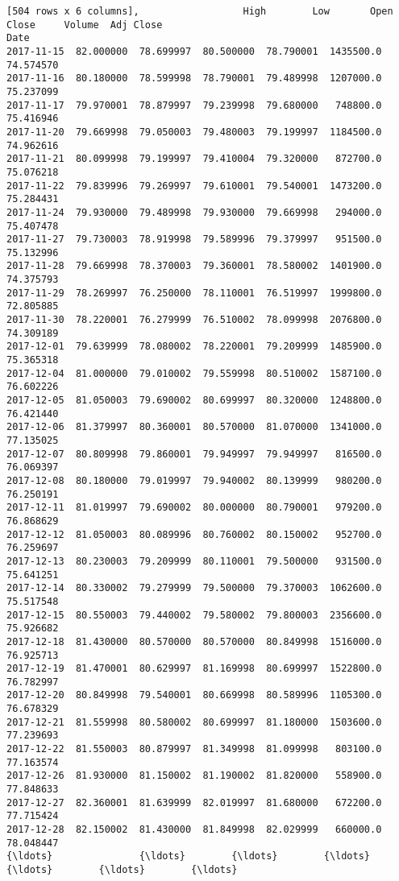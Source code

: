 \documentclass[11pt]{article}
\begin{document}
\begin{Verbatim}[commandchars=\\\{\}]
[504 rows x 6 columns],                  High        Low       Open      Close     Volume  Adj Close
Date                                                                        
2017-11-15  82.000000  78.699997  80.500000  78.790001  1435500.0  74.574570
2017-11-16  80.180000  78.599998  78.790001  79.489998  1207000.0  75.237099
2017-11-17  79.970001  78.879997  79.239998  79.680000   748800.0  75.416946
2017-11-20  79.669998  79.050003  79.480003  79.199997  1184500.0  74.962616
2017-11-21  80.099998  79.199997  79.410004  79.320000   872700.0  75.076218
2017-11-22  79.839996  79.269997  79.610001  79.540001  1473200.0  75.284431
2017-11-24  79.930000  79.489998  79.930000  79.669998   294000.0  75.407478
2017-11-27  79.730003  78.919998  79.589996  79.379997   951500.0  75.132996
2017-11-28  79.669998  78.370003  79.360001  78.580002  1401900.0  74.375793
2017-11-29  78.269997  76.250000  78.110001  76.519997  1999800.0  72.805885
2017-11-30  78.220001  76.279999  76.510002  78.099998  2076800.0  74.309189
2017-12-01  79.639999  78.080002  78.220001  79.209999  1485900.0  75.365318
2017-12-04  81.000000  79.010002  79.559998  80.510002  1587100.0  76.602226
2017-12-05  81.050003  79.690002  80.699997  80.320000  1248800.0  76.421440
2017-12-06  81.379997  80.360001  80.570000  81.070000  1341000.0  77.135025
2017-12-07  80.809998  79.860001  79.949997  79.949997   816500.0  76.069397
2017-12-08  80.180000  79.019997  79.940002  80.139999   980200.0  76.250191
2017-12-11  81.019997  79.690002  80.000000  80.790001   979200.0  76.868629
2017-12-12  81.050003  80.089996  80.760002  80.150002   952700.0  76.259697
2017-12-13  80.230003  79.209999  80.110001  79.500000   931500.0  75.641251
2017-12-14  80.330002  79.279999  79.500000  79.370003  1062600.0  75.517548
2017-12-15  80.550003  79.440002  79.580002  79.800003  2356600.0  75.926682
2017-12-18  81.430000  80.570000  80.570000  80.849998  1516000.0  76.925713
2017-12-19  81.470001  80.629997  81.169998  80.699997  1522800.0  76.782997
2017-12-20  80.849998  79.540001  80.669998  80.589996  1105300.0  76.678329
2017-12-21  81.559998  80.580002  80.699997  81.180000  1503600.0  77.239693
2017-12-22  81.550003  80.879997  81.349998  81.099998   803100.0  77.163574
2017-12-26  81.930000  81.150002  81.190002  81.820000   558900.0  77.848633
2017-12-27  82.360001  81.639999  82.019997  81.680000   672200.0  77.715424
2017-12-28  82.150002  81.430000  81.849998  82.029999   660000.0  78.048447
{\ldots}               {\ldots}        {\ldots}        {\ldots}        {\ldots}        {\ldots}        {\ldots}

\end{Verbatim}
\end{document}
